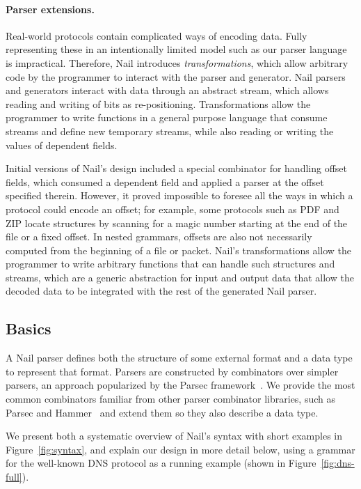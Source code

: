 \paragraph{Parser extensions.}
Real-world protocols contain complicated ways of encoding data. Fully representing these in an
intentionally limited model such as our parser language is impractical. Therefore, Nail introduces
\emph{transformations}, which allow arbitrary code by the programmer to interact with the parser and
generator. Nail parsers and generators interact with data through an abstract stream, which allows
reading and writing of bits as re-positioning. Transformations allow the programmer to write
functions in a general purpose language that consume streams and define new temporary streams, while
also reading or writing the values of dependent fields.

Initial versions of Nail's design included a special combinator for handling offset fields,
which consumed a dependent field and applied
a parser at the offset specified therein. However, it proved impossible to foresee all the ways in which a protocol could encode an offset;
for example, some protocols such as PDF and ZIP locate structures by scanning for a magic number starting at the
end of the file or a fixed offset. In nested grammars, offsets are also not necessarily computed from
the beginning of a file or packet.
Nail's transformations allow the programmer to write arbitrary functions that can
handle such structures and streams, which are a generic abstraction for input and
output data that allow the decoded data to be integrated with the rest of the
generated Nail parser.




\subsection{Basics}

A Nail parser defines both the structure of some external format and a data type to represent that
format. Parsers are constructed by combinators over simpler parsers, an approach popularized by the Parsec
framework~\cite{LeijenMeijer:parsec}. We provide the most common combinators familiar from other parser
 combinator libraries, such as Parsec and Hammer~\cite{hammer-parser} and extend them so they also
 describe a data type. 

We present both a systematic overview of Nail's syntax with short examples
in Figure~\ref{fig:syntax}, and explain our design in more detail below,
using a grammar for the well-known DNS protocol as a running example
(shown in Figure~\ref{fig:dns-full}).

